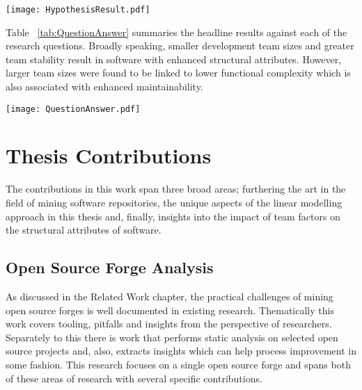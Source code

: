 \begin{table}
\begin{tabular}
 \centering 
 \texttt{[image: HypothesisResult.pdf]}
 \label{tab:HypothesisResult}
\end{tabular}
\end{table}

Table ~\ref{tab:QuestionAnswer} summaries the headline results against each of the research questions. Broadly speaking, smaller development team sizes and greater team stability result in software with enhanced structural attributes. However, larger team sizes were found to be linked to lower functional complexity which is also associated with enhanced maintainability.

\begin{table}
\begin{tabular}
 \centering 
 \texttt{[image: QuestionAnswer.pdf]}
 \label{tab:QuestionAnswer}
\end{tabular}
\end{table}

\section{Thesis Contributions} %
The contributions in this work span three broad areas; furthering the art in the field of mining software repositories, the unique aspects of the linear modelling approach in this thesis and, finally, insights into the impact of team factors on the structural attributes of software.

\subsection{Open Source Forge Analysis}
As discussed in the Related Work chapter, the practical challenges of mining open source forges is well documented in existing research. Thematically this work covers tooling, pitfalls and insights from the perspective of researchers. Separately to this there is work that performs static analysis on selected open source projects and, also, extracts insights which can help process improvement in some fashion. This research focuses on a single open source forge and spans both of these areas of research with several specific contributions.

